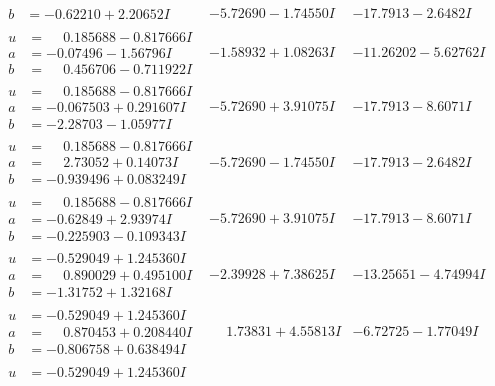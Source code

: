 \documentclass[1p]{elsarticle_modified}
\theoremstyle{definition}
\begin{document}
$$\begin{array}{c|c|c}
\begin{aligned}
b &= -0.62210 + 2.20652 I\end{aligned}
 & -5.72690 - 1.74550 I & -17.7913 - 2.6482 I \\ \hline\begin{aligned}
u &= \phantom{-}0.185688 - 0.817666 I \\
a &= -0.07496 - 1.56796 I \\
b &= \phantom{-}0.456706 - 0.711922 I\end{aligned}
 & -1.58932 + 1.08263 I & -11.26202 - 5.62762 I \\ \hline\begin{aligned}
u &= \phantom{-}0.185688 - 0.817666 I \\
a &= -0.067503 + 0.291607 I \\
b &= -2.28703 - 1.05977 I\end{aligned}
 & -5.72690 + 3.91075 I & -17.7913 - 8.6071 I \\ \hline\begin{aligned}
u &= \phantom{-}0.185688 - 0.817666 I \\
a &= \phantom{-}2.73052 + 0.14073 I \\
b &= -0.939496 + 0.083249 I\end{aligned}
 & -5.72690 - 1.74550 I & -17.7913 - 2.6482 I \\ \hline\begin{aligned}
u &= \phantom{-}0.185688 - 0.817666 I \\
a &= -0.62849 + 2.93974 I \\
b &= -0.225903 - 0.109343 I\end{aligned}
 & -5.72690 + 3.91075 I & -17.7913 - 8.6071 I \\ \hline\begin{aligned}
u &= -0.529049 + 1.245360 I \\
a &= \phantom{-}0.890029 + 0.495100 I \\
b &= -1.31752 + 1.32168 I\end{aligned}
 & -2.39928 + 7.38625 I & -13.25651 - 4.74994 I \\ \hline\begin{aligned}
u &= -0.529049 + 1.245360 I \\
a &= \phantom{-}0.870453 + 0.208440 I \\
b &= -0.806758 + 0.638494 I\end{aligned}
 & \phantom{-}1.73831 + 4.55813 I & -6.72725 - 1.77049 I \\ \hline\begin{aligned}
u &= -0.529049 + 1.245360 I \\

\end{aligned}
\end{array}$$
\end{document}
